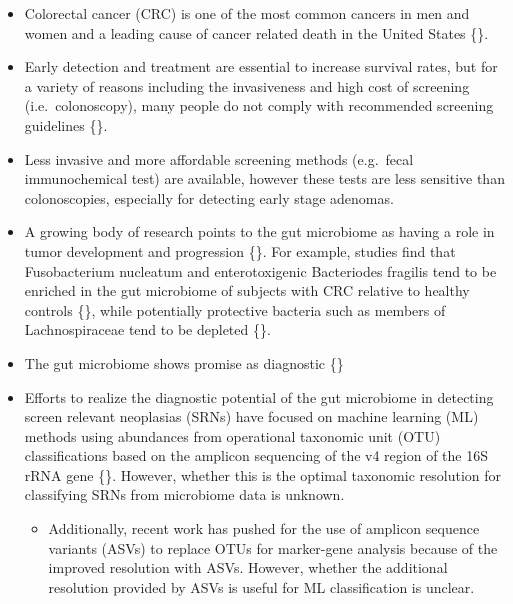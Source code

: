 \documentclass[
]{article}
\providecommand{\tightlist}{%
  \setlength{\itemsep}{0pt}\setlength{\parskip}{0pt}}
\begin{document}
\begin{itemize}
\tightlist
\item
  Colorectal cancer (CRC) is one of the most common cancers in men and
  women and a leading cause of cancer related death in the United States
  \{\}.
\item
  Early detection and treatment are essential to increase survival
  rates, but for a variety of reasons including the invasiveness and
  high cost of screening (i.e.~colonoscopy), many people do not comply
  with recommended screening guidelines \{\}.
\item
  Less invasive and more affordable screening methods (e.g.~fecal
  immunochemical test) are available, however these tests are less
  sensitive than colonoscopies, especially for detecting early stage
  adenomas.
\item
  A growing body of research points to the gut microbiome as having a
  role in tumor development and progression \{\}. For example, studies
  find that Fusobacterium nucleatum and enterotoxigenic Bacteriodes
  fragilis tend to be enriched in the gut microbiome of subjects with
  CRC relative to healthy controls \{\}, while potentially protective
  bacteria such as members of Lachnospiraceae tend to be depleted \{\}.
\item
  The gut microbiome shows promise as diagnostic \{\}
\item
  Efforts to realize the diagnostic potential of the gut microbiome in
  detecting screen relevant neoplasias (SRNs) have focused on machine
  learning (ML) methods using abundances from operational taxonomic unit
  (OTU) classifications based on the amplicon sequencing of the v4
  region of the 16S rRNA gene \{\}. However, whether this is the optimal
  taxonomic resolution for classifying SRNs from microbiome data is
  unknown.

  \begin{itemize}
  \tightlist
  \item
    Additionally, recent work has pushed for the use of amplicon
    sequence variants (ASVs) to replace OTUs for marker-gene analysis
    because of the improved resolution with ASVs. However, whether the
    additional resolution provided by ASVs is useful for ML
    classification is unclear.


\end{itemize}
\end{itemize}
\end{document}
